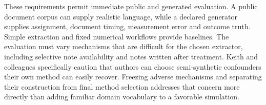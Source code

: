 These requirements permit immediate public and generated evaluation. A
public document corpus can supply realistic language, while a declared
generator supplies assignment, document timing, measurement error and
outcome truth. Simple extraction and fixed numerical workflows provide
baselines. The evaluation must vary mechanisms that are difficult for
the chosen extractor, including selective note availability and notes
written after treatment. Keith and colleagues specifically caution that
authors can choose semi-synthetic confounders their own method can
easily recover. Freezing adverse mechanisms and separating their
construction from final method selection addresses that concern more
directly than adding familiar domain vocabulary to a favorable
simulation. \cite{exec13_census_text_review_arxiv}

\label{exec13:census-measurement-end}
